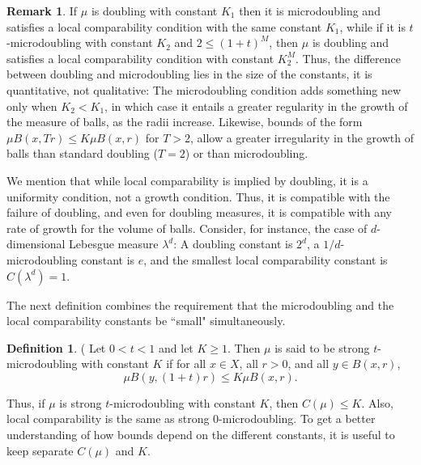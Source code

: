 \documentclass[12pt]{amsart}
\theoremstyle{definition}
\newtheorem{definition}[theorem]{Definition}
\newtheorem{remark}[theorem]{Remark}
\theoremstyle{parrafo}
\begin{document}
\begin{remark} \label{doublingandmicro}
 If $\mu$ is doubling with constant $K_1$ then it is microdoubling  and satisfies a local comparability
condition with the same constant $K_1$, while
if it is  $t$-microdoubling with constant $K_2$ and $2 \le (1 + t)^M$, then $\mu$ is doubling
and satisfies a local comparability
condition
with constant   $K_2^M$. Thus, the difference between doubling and 
microdoubling lies in the size of the constants, it is quantitative, not qualitative: The microdoubling condition adds something new only 
when $K_2 < K_1$, in which case it entails a greater regularity in the growth of the measure
of balls, as the radii increase. Likewise, 
bounds of the form $\mu B(x, T r) \le K \mu B(x, r)$ for $T > 2$, allow a greater irregularity in the growth of balls
than standard doubling ($T = 2$) or than microdoubling. 

We mention that  while local comparability is implied by
doubling, it is a uniformity condition, not a growth condition. Thus, it is compatible with
the failure of doubling, and even for doubling measures, it is compatible with
any rate of growth for the volume of balls.
Consider, for instance, the case of $d$-dimensional Lebesgue measure $\lambda^d$:
A doubling constant is $2^d$, a $1/d$-microdoubling constant is $e$,  and the smallest 
local comparability constant is $C(\lambda^d) = 1$. 

\end{remark}

The next definition combines the requirement that the microdoubling and the local comparability
constants be ``small" simultaneously. 

 \begin{definition} (\cite[p. 737] {NaTa} Let $0 < t < 1$ and let $K\ge 1$. Then 
  $\mu$ is said to be strong $t$-microdoubling with constant $K$ if for all $x \in X$, 
   all $r > 0$, and all $y\in B(x,r)$,
$$
\mu B\left(y,\left(1 +  t \right)r\right) \le K \mu B(x,r).
$$
\end{definition}


Thus, if $\mu$ is strong $t$-microdoubling with constant $K$, then $C(\mu) \le K$.
Also, local comparability is the same as strong $0$-microdoubling. To get a
 better understanding of how bounds depend on the different constants,
 it is useful to keep separate $C(\mu)$ and $ K$.
\end{document}
